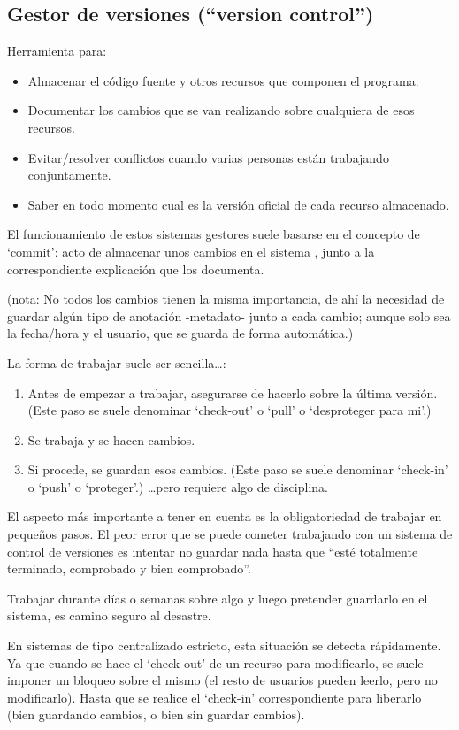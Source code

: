 \documentclass[spanish,12pt,a4paper,final,oneside]{book}
\begin{document}
\subsection{Gestor de versiones (``version control'')}
Herramienta para:
\begin{itemize}
\item Almacenar el código fuente y otros recursos que componen el programa.
\item Documentar los cambios que se van realizando sobre cualquiera de esos recursos.
\item Evitar/resolver conflictos cuando varias personas están trabajando conjuntamente.
\item Saber en todo momento cual es la versión oficial de cada recurso almacenado.
\end{itemize}

El funcionamiento de estos sistemas gestores suele basarse en el concepto de ‘commit’: acto de almacenar unos cambios en el sistema , junto a la correspondiente explicación que los documenta. 

(nota: No todos los cambios tienen la misma importancia, de ahí la necesidad de guardar algún tipo de anotación -metadato- junto a cada cambio; aunque solo sea la fecha/hora y el usuario, que se guarda de forma automática.)

La forma de trabajar suele ser sencilla\ldots:
\begin{enumerate}
\item Antes de empezar a trabajar, asegurarse de hacerlo sobre la última versión. (Este paso se suele denominar ‘check-out’ o ‘pull’ o ‘desproteger para mi’.)
\item Se trabaja y se hacen cambios. 
\item Si procede, se guardan esos cambios. (Este paso se suele denominar ‘check-in’ o ‘push’ o ‘proteger’.)
\ldots pero requiere algo de disciplina.
\end{enumerate}

El aspecto más importante a tener en cuenta es la obligatoriedad de trabajar en pequeños pasos. El peor error que se puede cometer trabajando con un sistema de control de versiones es intentar no guardar nada hasta que ``esté totalmente terminado, comprobado y bien comprobado''. 

Trabajar durante días o semanas sobre algo y luego pretender guardarlo en el sistema, es camino seguro al desastre.

En sistemas de tipo centralizado estricto, esta situación se detecta rápidamente. Ya que cuando se hace el ‘check-out’ de un recurso para modificarlo, se suele imponer un bloqueo sobre el mismo (el resto de usuarios pueden leerlo, pero no modificarlo). Hasta que se realice el ‘check-in’ correspondiente para liberarlo (bien guardando cambios, o bien sin guardar cambios). 
\end{document}
